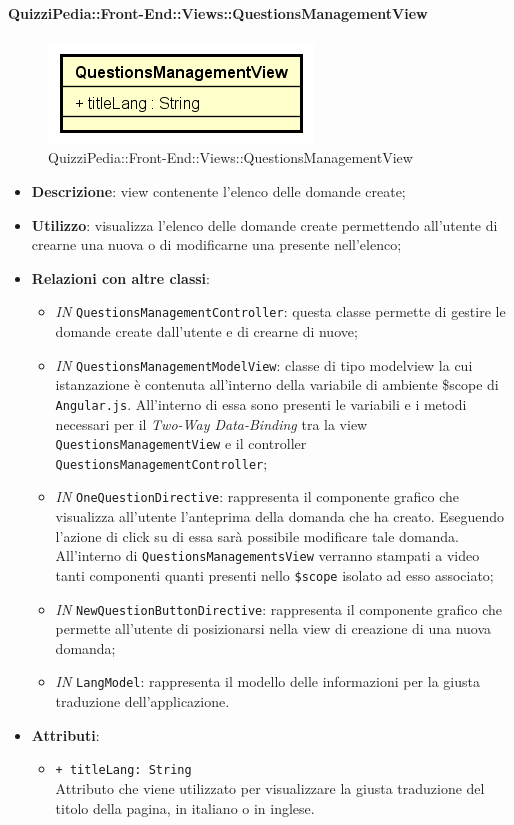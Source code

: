 \paragraph{QuizziPedia::Front-End::Views::QuestionsManagementView}
\begin{figure} [ht]
	\centering
	\includegraphics[scale=0.80]{UML/Classi/Front-End/QuizziPedia_Front-end_Views_QuestionsManagementView.png}
	\caption{QuizziPedia::Front-End::Views::QuestionsManagementView}
\end{figure} \FloatBarrier
\begin{itemize}
	\item \textbf{Descrizione}: view contenente l'elenco delle domande create; 
	\item \textbf{Utilizzo}: visualizza l'elenco delle domande create permettendo all'utente di crearne una nuova o di modificarne una presente nell'elenco;
	\item \textbf{Relazioni con altre classi}:
	\begin{itemize} 
		\item \textit{IN} \texttt{QuestionsManagementController}: questa classe permette di gestire le domande create dall'utente e di crearne di nuove;
		\item \textit{IN} \texttt{QuestionsManagementModelView}: classe di tipo modelview la cui istanzazione è contenuta all'interno della variabile di ambiente \$scope di \texttt{Angular.js}. All'interno di essa sono presenti le variabili e i metodi necessari per il \textit{Two-Way Data-Binding} tra la view \texttt{QuestionsManagementView} e il controller \texttt{QuestionsManagementController};
		\item \textit{IN} \texttt{OneQuestionDirective}: rappresenta il componente grafico che visualizza all'utente l'anteprima della domanda che ha creato. Eseguendo l'azione di click su di essa sarà possibile modificare tale domanda. All'interno di \texttt{QuestionsManagementsView} verranno stampati a video tanti componenti quanti presenti nello \texttt{\$scope} isolato ad esso associato;
		\item \textit{IN} \texttt{NewQuestionButtonDirective}:  rappresenta il componente grafico che permette all'utente di posizionarsi nella view di creazione di una nuova domanda;
		\item \textit{IN} \texttt{LangModel}: rappresenta il modello delle informazioni per la giusta traduzione dell'applicazione. 
	\end{itemize}
	\item \textbf{Attributi}:
	\begin{itemize}
		\item \texttt{+ titleLang: String} \\ Attributo che viene utilizzato per visualizzare la giusta traduzione del titolo della pagina, in italiano o in inglese.
	\end{itemize}
\end{itemize}
